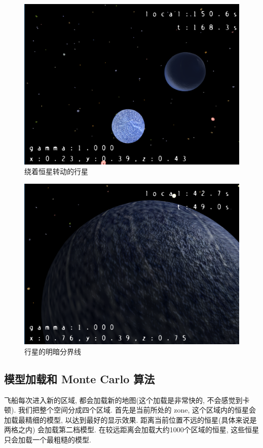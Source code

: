 \documentclass[a4paper,12pt,titlepage]{article}
\begin{document}
\begin{figure}[H]
\centering
	\includegraphics[scale=0.3]{05.png}
	\caption{绕着恒星转动的行星}
\end{figure}
	
\begin{figure}[H]
\centering
	\includegraphics[scale=0.3]{06.png}
	\caption{行星的明暗分界线}
\end{figure}
	
\subsection{模型加载和 Monte Carlo 算法}

	飞船每次进入新的区域, 都会加载新的地图(这个加载是非常快的, 不会感觉到卡顿). 我们把整个空间分成四个区域. 首先是当前所处的 zone, 这个区域内的恒星会加载最精细的模型, 以达到最好的显示效果. 距离当前位置不远的恒星(具体来说是两格之内) 会加载第二档模型. 在较远距离会加载大约1000个区域的恒星, 这些恒星只会加载一个最粗糙的模型. \\
	
\end{document}
